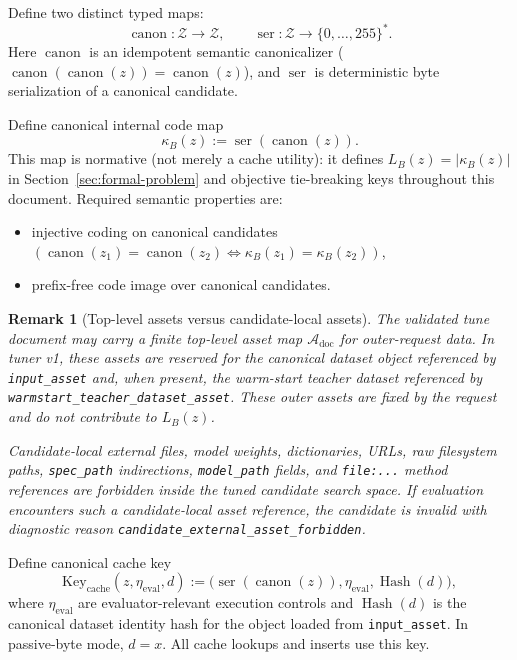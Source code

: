 \documentclass[11pt]{article}
\newtheorem{remark}{Remark}
\begin{document}
Define two distinct typed maps:
\[
\operatorname{canon}:\mathcal{Z}\to\mathcal{Z},
\qquad
\operatorname{ser}:\mathcal{Z}\to\{0,\dots,255\}^*.
\]
Here $\operatorname{canon}$ is an idempotent semantic canonicalizer
($\operatorname{canon}(\operatorname{canon}(z))=\operatorname{canon}(z)$), and
$\operatorname{ser}$ is deterministic byte serialization of a canonical
candidate.

Define canonical internal code map
\[
\kappa_B(z):=\operatorname{ser}(\operatorname{canon}(z)).
\]
This map is normative (not merely a cache utility): it defines
$L_B(z)=|\kappa_B(z)|$ in Section~\ref{sec:formal-problem} and objective
tie-breaking keys throughout this document. Required semantic properties are:
\begin{itemize}
    \item injective coding on canonical candidates
    $(\operatorname{canon}(z_1)=\operatorname{canon}(z_2)\iff
    \kappa_B(z_1)=\kappa_B(z_2))$,
    \item prefix-free code image over canonical candidates.
\end{itemize}

\begin{remark}[Top-level assets versus candidate-local assets]
The validated tune document may carry a finite top-level asset map
$\mathcal{A}_{\mathrm{doc}}$ for outer-request data. In tuner v1, these assets
are reserved for the canonical dataset object referenced by
\texttt{input\_asset} and, when present, the warm-start teacher dataset
referenced by \texttt{warmstart\_teacher\_dataset\_asset}. These outer assets
are fixed by the request and do not contribute to $L_B(z)$.

Candidate-local external files, model weights, dictionaries, URLs, raw
filesystem paths, \texttt{spec\_path} indirections, \texttt{model\_path}
fields, and \texttt{file:...} method references are forbidden inside the tuned
candidate search space. If evaluation encounters such a candidate-local asset
reference, the candidate is invalid with diagnostic reason
\texttt{candidate\_external\_asset\_forbidden}.
\end{remark}

Define canonical cache key
\[
\mathrm{Key}_{\mathrm{cache}}(z,\eta_{\mathrm{eval}},d):=
\Big(\operatorname{ser}(\operatorname{canon}(z)),\eta_{\mathrm{eval}},\operatorname{Hash}(d)\Big),
\]
where $\eta_{\mathrm{eval}}$ are evaluator-relevant execution controls and
$\operatorname{Hash}(d)$ is the canonical dataset identity hash for the object
loaded from \texttt{input\_asset}. In passive-byte mode, $d=x$. All cache
lookups and inserts use this key.
\end{document}
